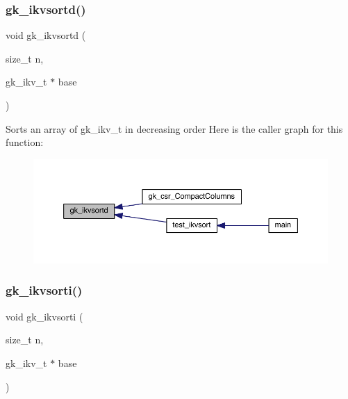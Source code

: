 \subsubsection{\texorpdfstring{gk\+\_\+ikvsortd()}{gk\_ikvsortd()}}
{\footnotesize\ttfamily void gk\+\_\+ikvsortd (\begin{DoxyParamCaption}\item[{size\+\_\+t}]{n,  }\item[{gk\+\_\+ikv\+\_\+t $\ast$}]{base }\end{DoxyParamCaption})}

Sorts an array of gk\+\_\+ikv\+\_\+t in decreasing order Here is the caller graph for this function\+:\nopagebreak
\begin{figure}[H]
\begin{center}
\leavevmode
\includegraphics[width=350pt]{a00140_a0fde2ad2770975c122bab802cbd5094b_icgraph}
\end{center}
\end{figure}
\mbox{\label{a00140_af0c57772aafc9ec6239683438641c08b}} 
\subsubsection{\texorpdfstring{gk\+\_\+ikvsorti()}{gk\_ikvsorti()}}
{\footnotesize\ttfamily void gk\+\_\+ikvsorti (\begin{DoxyParamCaption}\item[{size\+\_\+t}]{n,  }\item[{gk\+\_\+ikv\+\_\+t $\ast$}]{base }\end{DoxyParamCaption})}

